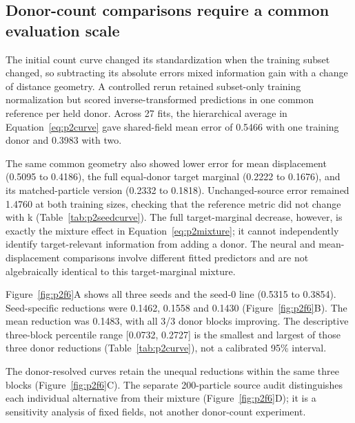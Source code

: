 \subsection{Donor-count comparisons require a common evaluation scale}

The initial count curve changed its standardization when the training subset changed, so subtracting its absolute errors mixed information gain with a change of distance geometry. A controlled rerun retained subset-only training normalization but scored inverse-transformed predictions in one common reference per held donor. Across 27 fits, the hierarchical average in Equation~\eqref{eq:p2curve} gave shared-field mean error of 0.5466 with one training donor and 0.3983 with two.

The same common geometry also showed lower error for mean displacement (0.5095 to 0.4186), the full equal-donor target marginal (0.2222 to 0.1676), and its matched-particle version (0.2332 to 0.1818). Unchanged-source error remained 1.4760 at both training sizes, checking that the reference metric did not change with k (Table~\ref{tab:p2seedcurve}). The full target-marginal decrease, however, is exactly the mixture effect in Equation~\eqref{eq:p2mixture}; it cannot independently identify target-relevant information from adding a donor. The neural and mean-displacement comparisons involve different fitted predictors and are not algebraically identical to this target-marginal mixture.

Figure~\ref{fig:p2f6}A\label{call:p2f6} shows all three seeds and the seed-0 line (0.5315 to 0.3854). Seed-specific reductions were 0.1462, 0.1558 and 0.1430 (Figure~\ref{fig:p2f6}B). The mean reduction was 0.1483, with all 3/3 donor blocks improving. The descriptive three-block percentile range {[}0.0732, 0.2727{]} is the smallest and largest of those three donor reductions (Table~\ref{tab:p2curve}), not a calibrated 95\% interval.



The donor-resolved curves retain the unequal reductions within the same three blocks (Figure~\ref{fig:p2f6}C). The separate 200-particle source audit distinguishes each individual alternative from their mixture (Figure~\ref{fig:p2f6}D); it is a sensitivity analysis of fixed fields, not another donor-count experiment.

